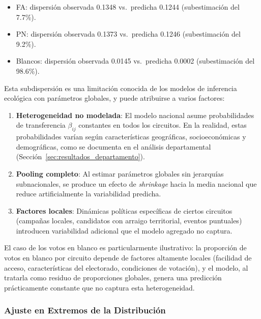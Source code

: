 \begin{itemize}
    \item FA: dispersi\'on observada 0.1348 vs.\ predicha 0.1244 (subestimaci\'on del 7.7\%).
    \item PN: dispersi\'on observada 0.1373 vs.\ predicha 0.1246 (subestimaci\'on del 9.2\%).
    \item Blancos: dispersi\'on observada 0.0145 vs.\ predicha 0.0002 (subestimaci\'on del 98.6\%).
\end{itemize}

Esta subdispersi\'on es una limitaci\'on conocida de los modelos de inferencia ecol\'ogica con par\'ametros globales, y puede atribuirse a varios factores:

\begin{enumerate}
    \item \textbf{Heterogeneidad no modelada}: El modelo nacional asume probabilidades de transferencia $\beta_{ij}$ constantes en todos los circuitos. En la realidad, estas probabilidades var\'ian seg\'un caracter\'isticas geogr\'aficas, socioecon\'omicas y demogr\'aficas, como se documenta en el an\'alisis departamental (Secci\'on~\ref{sec:resultados_departamento}).

    \item \textbf{Pooling completo}: Al estimar par\'ametros globales sin jerarqu\'ias subnacionales, se produce un efecto de \textit{shrinkage} hacia la media nacional que reduce artificialmente la variabilidad predicha.

    \item \textbf{Factores locales}: Din\'amicas pol\'iticas espec\'ificas de ciertos circuitos (campa\~nas locales, candidatos con arraigo territorial, eventos puntuales) introducen variabilidad adicional que el modelo agregado no captura.
\end{enumerate}

El caso de los votos en blanco es particularmente ilustrativo: la proporci\'on de votos en blanco por circuito depende de factores altamente locales (facilidad de acceso, caracter\'isticas del electorado, condiciones de votaci\'on), y el modelo, al tratarla como residuo de proporciones globales, genera una predicci\'on pr\'acticamente constante que no captura esta heterogeneidad.

\subsubsection{Ajuste en Extremos de la Distribuci\'on}

